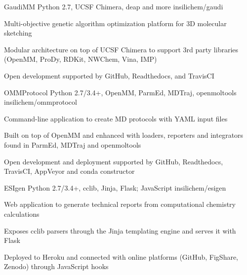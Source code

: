 


\begin{cventries}

  \projectentry
    {GaudiMM} %
    {Python 2.7, UCSF Chimera, deap and more} %
    {} %
    {insilichem/gaudi} %
    {
      \begin{cvitems} %
        \item {Multi-objective genetic algorithm optimization platform for 3D molecular sketching}
        \item {Modular architecture on top of UCSF Chimera to support 3rd party libraries (OpenMM, ProDy, RDKit, NWChem, Vina, IMP)}
        \item {Open development supported by GitHub, Readthedocs, and TravisCI}
      \end{cvitems}
    }

  \projectentry
    {OMMProtocol} %
    {Python 2.7/3.4+, OpenMM, ParmEd, MDTraj, openmoltools} %
    {} %
    {insilichem/ommprotocol} %
    {
      \begin{cvitems} %
        \item {Command-line application to create MD protocols with YAML input files}
        \item {Built on top of OpenMM and enhanced with loaders, reporters and integrators found in ParmEd, MDTraj and openmoltools}
        \item {Open development and deployment supported by GitHub, Readthedocs, TravisCI, AppVeyor and conda constructor}
      \end{cvitems}
    }

  \projectentry
    {ESIgen} %
    {Python 2.7/3.4+, cclib, Jinja, Flask; JavaScript} %
    {} %
    {insilichem/esigen} %
    {
      \begin{cvitems} %
        \item {Web application to generate technical reports from computational chemistry calculations}
        \item {Exposes cclib parsers through the Jinja templating engine and serves it with Flask}
        \item {Deployed to Heroku and connected with online platforms (GitHub, FigShare, Zenodo) through JavaScript hooks}
      \end{cvitems}
    }


\end{cventries}
